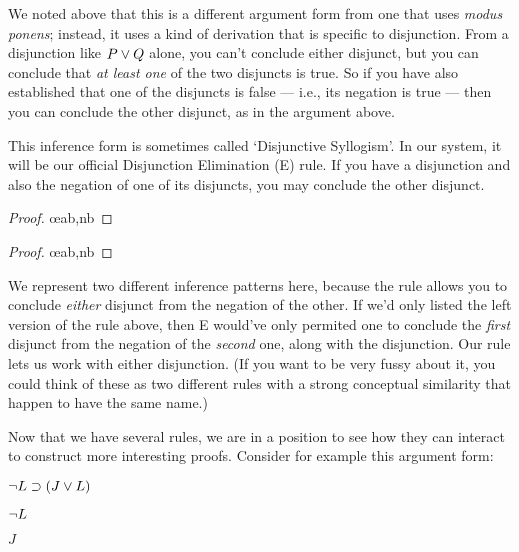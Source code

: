 We noted above that this is a different argument form from one that uses \emph{modus ponens}; instead, it uses a kind of derivation that is specific to disjunction. From a disjunction like $P \vee Q$ alone, you can't conclude either disjunct, but you can conclude that \emph{at least one} of the two disjuncts is true. So if you have also established that one of the disjuncts is false --- i.e., its negation is true --- then you can conclude the other disjunct, as in the argument above.

This inference form is sometimes called `Disjunctive Syllogism'. In our system, it will be our official Disjunction Elimination ({\eor}E) rule. If you have a disjunction and also the negation of one of its disjuncts, you may conclude the other disjunct.

\begin{multicols}{2}
\begin{proof}
	\metaA{} \oe{ab,nb}
\end{proof}

\begin{proof}
	\metaB{} \oe{ab,nb}
\end{proof}

\end{multicols}

We represent two different inference patterns here, because the rule allows you to conclude \emph{either} disjunct from the negation of the other. If we'd only listed the left version of the rule above, then {\eor}E would've only permited one to conclude the \emph{first} disjunct from the negation of the \emph{second} one, along with the disjunction. Our rule lets us work with either disjunction. (If you want to be very fussy about it, you could think of these as two different rules with a strong conceptual similarity that happen to have the same name.)

Now that we have several rules, we are in a position to see how they can interact to construct more interesting proofs. Consider for example this argument form:

\begin{earg}
\item[] $\neg L \supset (J \vee L)$
\item[] $\neg L$
\item[\therefore] $J$
\end{earg}

